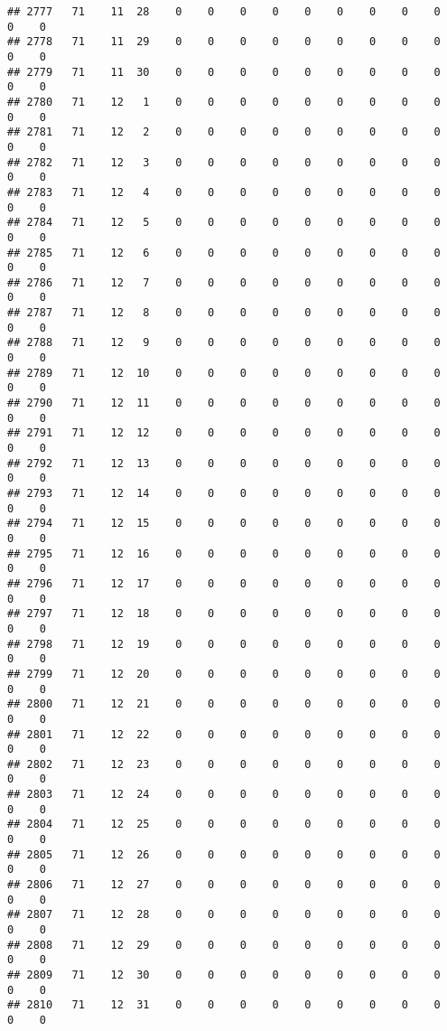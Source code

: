 \documentclass[]{article}
\begin{document}
\begin{verbatim}
## 2777   71    11  28    0    0    0    0    0    0    0    0    0    0    0
## 2778   71    11  29    0    0    0    0    0    0    0    0    0    0    0
## 2779   71    11  30    0    0    0    0    0    0    0    0    0    0    0
## 2780   71    12   1    0    0    0    0    0    0    0    0    0    0    0
## 2781   71    12   2    0    0    0    0    0    0    0    0    0    0    0
## 2782   71    12   3    0    0    0    0    0    0    0    0    0    0    0
## 2783   71    12   4    0    0    0    0    0    0    0    0    0    0    0
## 2784   71    12   5    0    0    0    0    0    0    0    0    0    0    0
## 2785   71    12   6    0    0    0    0    0    0    0    0    0    0    0
## 2786   71    12   7    0    0    0    0    0    0    0    0    0    0    0
## 2787   71    12   8    0    0    0    0    0    0    0    0    0    0    0
## 2788   71    12   9    0    0    0    0    0    0    0    0    0    0    0
## 2789   71    12  10    0    0    0    0    0    0    0    0    0    0    0
## 2790   71    12  11    0    0    0    0    0    0    0    0    0    0    0
## 2791   71    12  12    0    0    0    0    0    0    0    0    0    0    0
## 2792   71    12  13    0    0    0    0    0    0    0    0    0    0    0
## 2793   71    12  14    0    0    0    0    0    0    0    0    0    0    0
## 2794   71    12  15    0    0    0    0    0    0    0    0    0    0    0
## 2795   71    12  16    0    0    0    0    0    0    0    0    0    0    0
## 2796   71    12  17    0    0    0    0    0    0    0    0    0    0    0
## 2797   71    12  18    0    0    0    0    0    0    0    0    0    0    0
## 2798   71    12  19    0    0    0    0    0    0    0    0    0    0    0
## 2799   71    12  20    0    0    0    0    0    0    0    0    0    0    0
## 2800   71    12  21    0    0    0    0    0    0    0    0    0    0    0
## 2801   71    12  22    0    0    0    0    0    0    0    0    0    0    0
## 2802   71    12  23    0    0    0    0    0    0    0    0    0    0    0
## 2803   71    12  24    0    0    0    0    0    0    0    0    0    0    0
## 2804   71    12  25    0    0    0    0    0    0    0    0    0    0    0
## 2805   71    12  26    0    0    0    0    0    0    0    0    0    0    0
## 2806   71    12  27    0    0    0    0    0    0    0    0    0    0    0
## 2807   71    12  28    0    0    0    0    0    0    0    0    0    0    0
## 2808   71    12  29    0    0    0    0    0    0    0    0    0    0    0
## 2809   71    12  30    0    0    0    0    0    0    0    0    0    0    0
## 2810   71    12  31    0    0    0    0    0    0    0    0    0    0    0

\end{verbatim}
\end{document}
